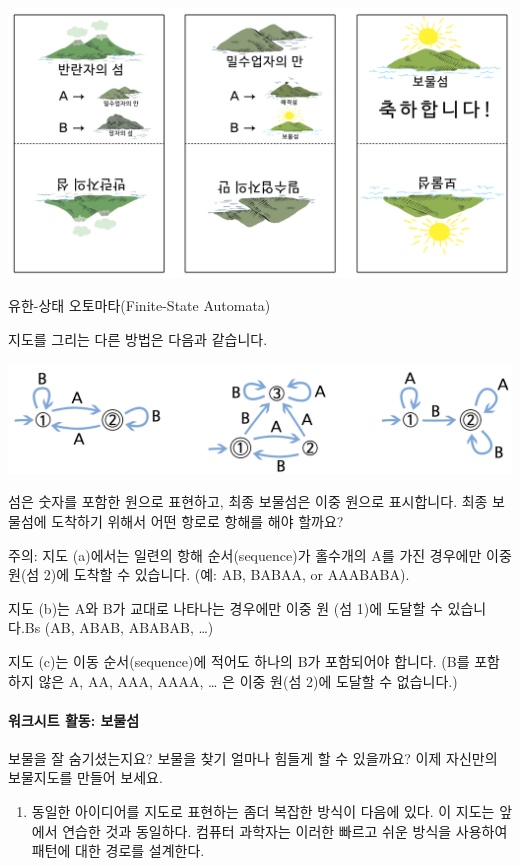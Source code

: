 \documentclass[]{article}
\begin{document}
\includegraphics{csunplugged/03-part/img/ch12-fsm/11-fsm-04-treasury-map-card02.png}

유한-상태 오토마타(Finite-State Automata)

지도를 그리는 다른 방법은 다음과 같습니다.

\includegraphics{csunplugged/03-part/img/ch12-fsm/11-fsm-05-finite-state-automata.png}

섬은 숫자를 포함한 원으로 표현하고, 최종 보물섬은 이중 원으로
표시합니다. 최종 보물섬에 도착하기 위해서 어떤 항로로 항해를 해야
할까요?

주의: 지도 (a)에서는 일련의 항해 순서(sequence)가 홀수개의 A를 가진
경우에만 이중 원(섬 2)에 도착할 수 있습니다. (예: AB, BABAA, or
AAABABA).

지도 (b)는 A와 B가 교대로 나타나는 경우에만 이중 원 (섬 1)에 도달할 수
있습니다.Bs (AB, ABAB, ABABAB, \ldots{})

지도 (c)는 이동 순서(sequence)에 적어도 하나의 B가 포함되어야 합니다.
(B를 포함하지 않은 A, AA, AAA, AAAA, \ldots{} 은 이중 원(섬 2)에 도달할
수 없습니다.)

\mbox{}\paragraph{워크시트 활동: 보물섬}\label{section-167}

보물을 잘 숨기셨는지요? 보물을 찾기 얼마나 힘들게 할 수 있을까요? 이제
자신만의 보물지도를 만들어 보세요.

\begin{enumerate}
\itemsep1pt\parskip0pt
\item
  동일한 아이디어를 지도로 표현하는 좀더 복잡한 방식이 다음에 있다. 이
  지도는 앞에서 연습한 것과 동일하다. 컴퓨터 과학자는 이러한 빠르고 쉬운
  방식을 사용하여 패턴에 대한 경로를 설계한다.
\end{enumerate}
\end{document}
